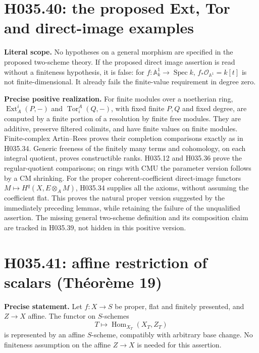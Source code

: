\section{H035.40: the proposed Ext, Tor and direct-image examples}
\textbf{Literal scope.} No hypotheses on a general morphism are
specified in the proposed two-scheme theory. If the proposed direct
image assertion is read without a finiteness hypothesis, it is false:
for $f:\mathbb A^1_k\to\operatorname{Spec}k$,
$f_*\mathcal O_{\mathbb A^1}=k[t]$ is not finite-dimensional.
It already fails the finite-value requirement in degree zero.

\textbf{Precise positive realization.} For finite modules over a
noetherian ring, $\operatorname{Ext}^i_A(P,-)$ and
$\operatorname{Tor}_i^A(Q,-)$, with fixed finite $P,Q$ and fixed
degree, are computed by a finite portion of a resolution by finite
free modules. They are additive, preserve filtered colimits, and
have finite values on finite modules. Finite-complex Artin--Rees
proves their completion comparisons exactly as in H035.34.
Generic freeness of the finitely many terms and cohomology, on
each integral quotient, proves constructible ranks. H035.12
and H035.36 prove the regular-quotient comparisons; on rings
with CMU the parameter version follows by a CM shrinking.
For the proper coherent-coefficient direct-image functors
$M\mapsto H^q(X,E\otimes_A M)$, H035.34 supplies all the
axioms, without assuming the coefficient flat. This proves the
natural proper version suggested by the immediately preceding
lemmas, while retaining the failure of the unqualified assertion.
The missing general two-scheme definition and its composition
claim are tracked in H035.39, not hidden in this positive version.

\section{H035.41: affine restriction of scalars (Théorème 19)}
\textbf{Precise statement.} Let $f:X\to S$ be proper, flat and
finitely presented, and $Z\to X$ affine. The functor on $S$-schemes
\[
 T\longmapsto\operatorname{Hom}_{X_T}(X_T,Z_T)
\]
is represented by an affine $S$-scheme, compatibly with arbitrary
base change. No finiteness assumption on the affine $Z\to X$
is needed for this assertion.


